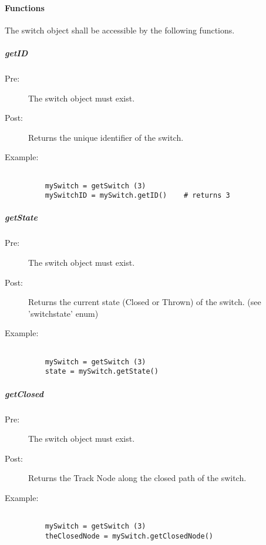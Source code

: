 \documentclass[a4paper,11pt,notitlepage]{article}
\def\TN{Track Node\xspace}
\begin{document}
\paragraph{Functions}
The switch object shall be accessible by the following functions.

\subparagraph{getID}
\begin{description}
\item[\hspace{1cm}Pre:] The switch object must exist.
\item[\hspace{1cm}Post:] Returns the unique identifier of the switch.
\item[\hspace{1cm}Example:]
\begin{verbatim}

    mySwitch = getSwitch (3)
    mySwitchID = mySwitch.getID()    # returns 3
\end{verbatim}
\end{description}

\subparagraph{getState}
\begin{description}
\item[\hspace{1cm}Pre:] The switch object must exist.
\item[\hspace{1cm}Post:] Returns the current state (Closed or Thrown) of the switch. (see 'switchstate' enum)
\item[\hspace{1cm}Example:]
\begin{verbatim}

    mySwitch = getSwitch (3)
    state = mySwitch.getState()
\end{verbatim}
\end{description}

\subparagraph{getClosed}
\begin{description}
\item[\hspace{1cm}Pre:] The switch object must exist.
\item[\hspace{1cm}Post:] Returns the \TN along the closed path of the switch.
\item[\hspace{1cm}Example:]
\begin{verbatim}

    mySwitch = getSwitch (3)
    theClosedNode = mySwitch.getClosedNode()
\end{verbatim}
\end{description}
\end{document}
